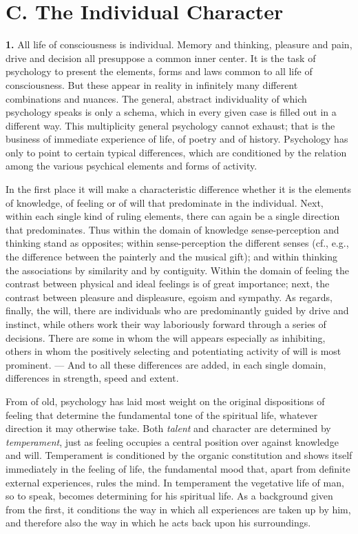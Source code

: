 \documentclass[12pt,a4paper]{book}
\newcommand{\opage}[1]{\marginnote{\footnotesize\textit{[#1]}}}
\begin{document}
\section*{C. The Individual Character}

\textbf{1.} All life of consciousness is individual. Memory and thinking,
pleasure and pain, drive and decision all presuppose a common inner
center. It is the task of psychology to present the elements, forms and
laws common to all life of consciousness. But these appear in reality in
infinitely many different combinations and nuances. The general, abstract
individuality of which psychology speaks is only a schema, which in every
given case is filled out in a different way. This multiplicity general
psychology cannot exhaust; that is the business of immediate experience of
life, of poetry and of history. Psychology has only to point to certain
typical differences, which are conditioned by the relation among the
various psychical elements and forms of activity.

In the first place it will make a characteristic difference whether it is
the elements of knowledge, of feeling or of will that predominate in the
individual. Next, within
\opage{405}each single kind of ruling elements, there can again be a single
direction that predominates. Thus within the domain of knowledge
sense-perception and thinking stand as opposites; within sense-perception
the different senses (cf., e.g., the difference between the painterly and
the musical gift); and within thinking the associations by similarity and
by contiguity. Within the domain of feeling the contrast between physical
and ideal feelings is of great importance; next, the contrast between
pleasure and displeasure, egoism and sympathy. As regards, finally, the
will, there are individuals who are predominantly guided by drive and
instinct, while others work their way laboriously forward through a
series of decisions. There are some in whom the will appears especially
as inhibiting, others in whom the positively selecting and potentiating
activity of will is most prominent. --- And to all these differences are
added, in each single domain, differences in strength, speed and extent.

From of old, psychology has laid most weight on the original dispositions
of feeling that determine the fundamental tone of the spiritual life,
whatever direction it may otherwise take. Both \emph{talent} and
character are determined by \emph{temperament}, just as feeling occupies a
central position over against knowledge and will. Temperament is
conditioned by the organic constitution and shows itself immediately in
the feeling of life, the fundamental mood that, apart from definite
external experiences, rules the mind. In temperament the vegetative life
of man, so to speak, becomes determining for his spiritual life. As a
background given from the first, it conditions the way in which all
experiences are taken up by him, and therefore also the way in which he
acts back upon his surroundings.
\end{document}
